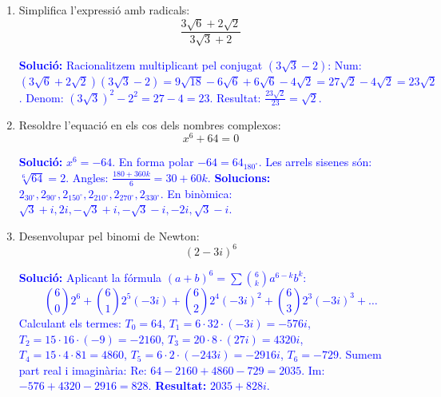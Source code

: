 \documentclass[12pt,a4paper]{article}
\newcommand{\solucio}[1]{%
    \par\vspace{5pt}\noindent\textcolor{blue}{\textbf{Solució:} #1}\par\vspace{10pt}%
}
\begin{document}
\begin{enumerate}[label=\textbf{\arabic*.}]
    \solucio{
    Simplifiquem el claudàtor. Numerador: treiem factor comú $3(x+1)$:
    \[ 3(x+1)[(x+1)-2] = 3(x+1)(x-1) \]
    Denominador: $(x+1)(x-1)$.
    La fracció és: $\frac{3(x+1)(x-1)}{(x+1)(x-1)} = 3$. Amb el signe menys davant queda $-3$.
    Equació resultant: $-3(1+2x) = -4 \implies 1+2x = 4/3 \implies 2x = 1/3$.
    \textbf{Solució:} $x = 1/6$.
    }

    \item Simplifica l'expressió amb radicals:
    \[ \frac{3\sqrt{6}+2\sqrt{2}}{3\sqrt{3}+2} \]
    
    \solucio{
    Racionalitzem multiplicant pel conjugat $(3\sqrt{3}-2)$:
    Num: $(3\sqrt{6}+2\sqrt{2})(3\sqrt{3}-2) = 9\sqrt{18} - 6\sqrt{6} + 6\sqrt{6} - 4\sqrt{2} = 27\sqrt{2} - 4\sqrt{2} = 23\sqrt{2}$.
    Denom: $(3\sqrt{3})^2 - 2^2 = 27 - 4 = 23$.
    Resultat: $\frac{23\sqrt{2}}{23} = \boxed{\sqrt{2}}$.
    }

    \item Resoldre l'equació en els cos dels nombres complexos:
    \[ x^{6}+64=0 \]
    
    \solucio{
    $x^6 = -64$. En forma polar $-64 = 64_{180^{\circ}}$.
    Les arrels sisenes són: $\sqrt[6]{64} = 2$. Angles: $\frac{180 + 360k}{6} = 30 + 60k$.
    \textbf{Solucions:} $2_{30^{\circ}}, 2_{90^{\circ}}, 2_{150^{\circ}}, 2_{210^{\circ}}, 2_{270^{\circ}}, 2_{330^{\circ}}$.
    En binòmica: $\sqrt{3}+i, 2i, -\sqrt{3}+i, -\sqrt{3}-i, -2i, \sqrt{3}-i$.
    }

    \item Desenvolupar pel binomi de Newton:
    \[ (2-3i)^{6} \]
    
    \solucio{
    Aplicant la fórmula $(a+b)^6 = \sum \binom{6}{k} a^{6-k}b^k$:
    \[ \binom{6}{0}2^6 + \binom{6}{1}2^5(-3i) + \binom{6}{2}2^4(-3i)^2 + \binom{6}{3}2^3(-3i)^3 + \dots \]
    Calculant els termes:
    $T_0 = 64$, $T_1 = 6 \cdot 32 \cdot (-3i) = -576i$, $T_2 = 15 \cdot 16 \cdot (-9) = -2160$,
    $T_3 = 20 \cdot 8 \cdot (27i) = 4320i$, $T_4 = 15 \cdot 4 \cdot 81 = 4860$,
    $T_5 = 6 \cdot 2 \cdot (-243i) = -2916i$, $T_6 = -729$.
    Sumem part real i imaginària:
    Re: $64 - 2160 + 4860 - 729 = 2035$.
    Im: $-576 + 4320 - 2916 = 828$.
    \textbf{Resultat:} $2035 + 828i$.
    }

\end{enumerate}
\end{document}
